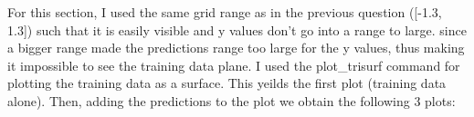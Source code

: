 \documentclass[10pt]{article}
\begin{document}
  
For this section, I used the same grid range as in the previous question ([-1.3, 1.3]) such that it is easily visible and
y values don't go into a range to large.
since a bigger range made the predictions range too large for the y values, thus making it 
impossible to see the training data plane. I used the plot\_trisurf command
for plotting the training data as a surface. This yeilds the first plot (training data alone).
Then, adding the predictions to the plot we obtain the following 3 plots:

\begin{figure}[H]       

\end{figure}
\end{document}
